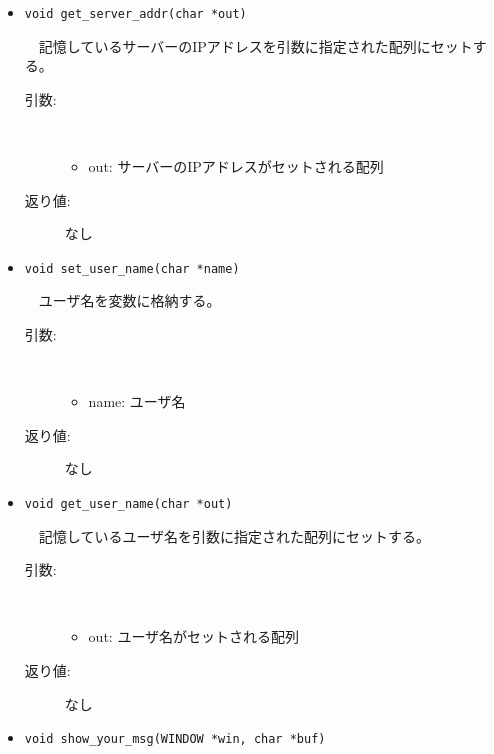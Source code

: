 \documentclass[uplatex,dvipdfmx,11pt,a4paper]{jsarticle} %
\begin{document}
\begin{itemize}
    \item {\tt void get\_server\_addr(char *out)}

        　記憶しているサーバーのIPアドレスを引数に指定された配列にセットする。
        \begin{description}
            \item[引数:] \ 

                \begin{itemize}
                    \item out: サーバーのIPアドレスがセットされる配列
                \end{itemize}
            \item[返り値:] なし
            \newline
        \end{description}

    \item {\tt void set\_user\_name(char *name)}

        　ユーザ名を変数に格納する。
        \begin{description}
            \item[引数:] \ 

                \begin{itemize}
                    \item name: ユーザ名
                \end{itemize}
            \item[返り値:] なし
            \newline
        \end{description}

    \item {\tt void get\_user\_name(char *out)}

        　記憶しているユーザ名を引数に指定された配列にセットする。
        \begin{description}
            \item[引数:] \ 

                \begin{itemize}
                    \item out: ユーザ名がセットされる配列
                \end{itemize}
            \item[返り値:] なし
            \newline
        \end{description}

    \item {\tt void show\_your\_msg(WINDOW *win, char *buf)}


\end{itemize}
\end{document}
